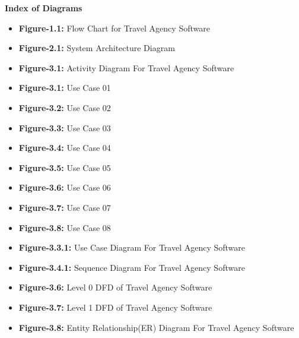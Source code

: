 \documentclass{scrreprt}
\begin{document}
\tableofcontents
\begin{center}
    \parbox{0.8\textwidth}{ 
        \centering
        \textbf{Index of Diagrams}
        
        \begin{itemize}
            \item \textbf{Figure-1.1:} Flow Chart for Travel Agency Software 
            \item \textbf{Figure-2.1:} System Architecture Diagram 
            \item \textbf{Figure-3.1:} Activity Diagram For Travel Agency Software 
            \item \textbf{Figure-3.1:} Use Case 01 
            \item \textbf{Figure-3.2:} Use Case 02 
            \item \textbf{Figure-3.3:} Use Case 03 
            \item \textbf{Figure-3.4:} Use Case 04 
            \item \textbf{Figure-3.5:} Use Case 05 
            \item \textbf{Figure-3.6:} Use Case 06 
            \item \textbf{Figure-3.7:} Use Case 07 
            \item \textbf{Figure-3.8:} Use Case 08 
            \item \textbf{Figure-3.3.1:} Use Case Diagram For Travel Agency Software 
            \item \textbf{Figure-3.4.1:} Sequence Diagram For Travel Agency Software 
            \item \textbf{Figure-3.6:} Level 0 DFD of Travel Agency Software 
            \item \textbf{Figure-3.7:} Level 1 DFD of Travel Agency Software 
            \item \textbf{Figure-3.8:} Entity Relationship(ER) Diagram For Travel Agency Software 
        \end{itemize}
    }
\end{center}
\end{document}
